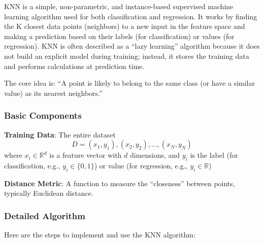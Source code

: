 KNN is a simple, non-parametric, and instance-based supervised machine learning algorithm used for both classification and regression.
It works by finding the K closest data points (neighbors) to a new input in the feature space and making a prediction based on their labels (for classification) or values (for regression).
KNN is often described as a ``lazy learning'' algorithm because it does not build an explicit model during training; instead, it stores the training data and performs calculations at prediction time.

The core idea is: ``A point is likely to belong to the same class (or have a similar value) as its nearest neighbors.''

\subsubsection{Basic Components}\text{}

\smallskip
\textbf{Training Data}: The entire dataset
\[D = {(x_1, y_1), (x_2, y_2), \ldots, (x_N, y_N)}\]
where $x_i \in \mathbb{R}^d$ is a feature vector with $d$ dimensions, and $y_i$ is the label (for classification, e.g., $y_i \in \{0,1\}$) or value (for regression, e.g., $y_i \in \mathbb{R}$)

\textbf{Distance Metric}: A function to measure the ``closeness'' between points, typically Euclidean distance.

\smallskip

\subsubsection{Detailed Algorithm}\text{}

Here are the steps to implement and use the KNN algorithm:


